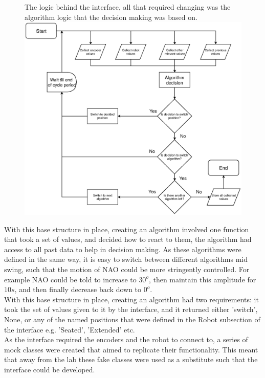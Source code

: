 \documentclass[11pt]{article}
\begin{document}
    \begin{figure}[!htb]
        \centering
        \captionbox
             {The logic behind the interface, all that required changing was the algorithm logic that the decision making was based on.\label{InterfaceLogic}}
             {\includegraphics[width=1.0\textwidth]{InterfaceLogic.eps}}
    \end{figure}

With this base structure in place, creating an algorithm involved one function that took a set of values, and decided how to react to them, the algorithm had access to all past data to help in decision making. As these algorithms were defined in the same way, it is easy to switch between different algorithms mid swing, such that the motion of NAO could be more stringently controlled. For example NAO could be told to increase to $30^o$, then maintain this amplitude for $10s$, and then finally decrease back down to $0^o$.\\

With this base structure in place, creating an algorithm had two requirements: it took the set of values given to it by the interface, and it returned either 'switch', None, or any of the named positions that were defined in the Robot subsection of the interface e.g. 'Seated', 'Extended' etc.\\

As the interface required the encoders and the robot to connect to, a series of mock classes were created that aimed to replicate their functionality. This meant that away from the lab these fake classes were used as a substitute such that the interface could be developed.
\end{document}
